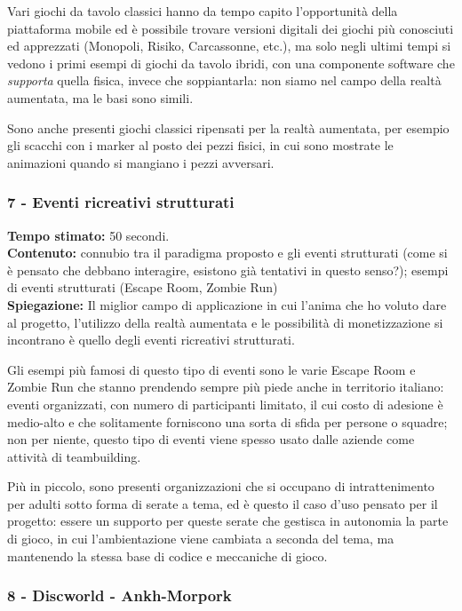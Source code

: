 \documentclass[
	twoside]				%
	{toptesi}				%
\begin{document}
	Vari giochi da tavolo classici hanno da tempo capito l'opportunità della piattaforma mobile ed è possibile trovare versioni digitali dei giochi più conosciuti ed apprezzati (Monopoli, Risiko, Carcassonne, etc.), ma solo negli ultimi tempi si vedono i primi esempi di giochi da tavolo ibridi, con una componente software che \emph{supporta} quella fisica, invece che soppiantarla: non siamo nel campo della realtà aumentata, ma le basi sono simili.
	
	Sono anche presenti giochi classici ripensati per la realtà aumentata, per esempio gli scacchi con i marker al posto dei pezzi fisici, in cui sono mostrate le animazioni quando si mangiano i pezzi avversari.
	
	\subsubsection{7 - Eventi ricreativi strutturati}
	
	\textbf{Tempo stimato:} 50 secondi. \\
	
	\textbf{Contenuto:} connubio tra il paradigma proposto e gli eventi strutturati (come si è pensato che debbano interagire, esistono già tentativi in questo senso?); esempi di eventi strutturati (Escape Room, Zombie Run) \\
	
	\textbf{Spiegazione:} Il miglior campo di applicazione in cui l'anima che ho voluto dare al progetto, l'utilizzo della realtà aumentata e le possibilità di monetizzazione si incontrano è quello degli eventi ricreativi strutturati.
	
	Gli esempi più famosi di questo tipo di eventi sono le varie Escape Room e Zombie Run che stanno prendendo sempre più piede anche in territorio italiano: eventi organizzati, con numero di participanti limitato, il cui costo di adesione è medio-alto e che solitamente forniscono una sorta di sfida per persone o squadre; non per niente, questo tipo di eventi viene spesso usato dalle aziende come attività di teambuilding.
	
	Più in piccolo, sono presenti organizzazioni che si occupano di intrattenimento per adulti sotto forma di serate a tema, ed è questo il caso d'uso pensato per il progetto: essere un supporto per queste serate che gestisca in autonomia la parte di gioco, in cui l'ambientazione viene cambiata a seconda del tema, ma mantenendo la stessa base di codice e meccaniche di gioco.
	
	\subsubsection{8 - Discworld - Ankh-Morpork}
	
\end{document}
